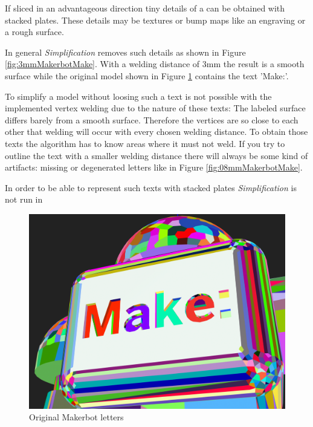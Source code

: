\documentclass[../ClassicThesis.tex]{subfiles}
\begin{document}
If sliced in an advantageous direction tiny details of a {\threedmodel} can be obtained with stacked plates. These details may be textures or bump maps like an engraving or a rough surface.

In general \emph{Simplification} removes such details as shown in Figure \ref{fig:3mmMakerbotMake}. With a welding distance of 3mm the result is a smooth surface while the original model shown in Figure \ref{fig:origMakerbotMake} contains the text 'Make:'.

To simplify a model without loosing such a text is not possible with the implemented vertex welding due to the nature of these texts: The labeled surface differs barely from a smooth surface. Therefore the vertices are so close to each other that welding will occur with every chosen welding distance. To obtain those texts the algorithm has to know areas where it must not weld. If you try to outline the text with a smaller welding distance there will always be some kind of artifacts: missing or degenerated letters like in Figure \ref{fig:08mmMakerbotMake}.

In order to be able to represent such texts with stacked plates \emph{Simplification} is not run in 


\begin{figure}
\includegraphics[width=0.8\columnwidth]{Images/04-approx-welding-make-unwelded.png}
\caption{Original Makerbot letters}
\label{fig:origMakerbotMake}
\end{figure}
\end{document}
